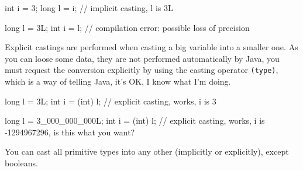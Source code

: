 \documentclass[8pt, a4paper, oneside]{extarticle}
\begin{document}
\begin{blackboard}
int i = 3;
long l = i; // implicit casting, l is 3L

long l = 3L;
int i = l; // compilation error: possible loss of precision
\end{blackboard}

Explicit castings are performed when casting a big variable into a smaller one.
As you can loose some data, they are not performed automatically by Java, you
must request the conversion explicitly by using the casting operator
\verb+(type)+, which is a way of telling Java, it's OK, I know what I'm doing.

\begin{blackboard}
long l = 3L;
int i = (int) l; // explicit casting, works, i is 3

long l = 3_000_000_000L;
int i = (int) l; // explicit casting, works, i is -1294967296, is this what you want?
\end{blackboard}

You can cast all primitive types into any other (implicitly or explicitly),
except booleans.
\end{document}
